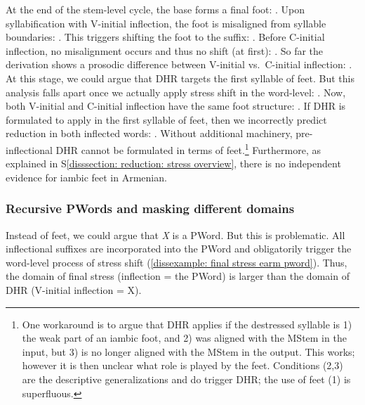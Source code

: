 At the end of the stem-level cycle, the base forms a final foot: \textit{}. Upon syllabification with V-initial inflection, the   foot is misaligned from syllable boundaries: \textit{}. This triggers shifting the foot to the suffix: \textit{}. Before C-initial inflection, no misalignment occurs and thus no shift (at first): \textit{}. 
So far the derivation shows a prosodic difference between V-initial vs.\ C-initial inflection: \textit{}. At this stage, we could argue that DHR targets the first syllable of feet. But this analysis falls apart once we actually apply stress shift in the word-level:    \textit{}. Now, both V-initial and C-initial inflection have the same foot structure:   \textit{}.  If DHR is formulated to apply in the first syllable of feet, then we incorrectly predict reduction in both inflected words: \textit{}. Without additional machinery, pre-inflectional DHR cannot be formulated in terms of feet.\footnote{One workaround is to argue that DHR applies if the destressed syllable is 1) the weak part of an iambic foot, and 2) was aligned with the MStem in the input, but 3) is no longer aligned with the MStem in the output. This works; however it is then unclear what role is played by the feet. Conditions (2,3) are the descriptive generalizations and do trigger DHR; the use of feet (1) is superfluous.} Furthermore, as explained in S\ref{disssection: reduction: stress overview}, there is no independent evidence for iambic feet in Armenian.%




\subsubsection{Recursive PWords and masking different domains}\label{disssection: reduction: destressed reduction EA: pword and feet: pword}

Instead of feet, we could argue that \textit{X} is a PWord. But this is problematic. All inflectional suffixes are incorporated into the PWord and   obligatorily trigger  the word-level process of  stress shift (\ref{dissexample: final stress earm pword}). Thus, the domain of final stress (inflection = the PWord) is larger than  the   domain  of DHR (V-initial inflection = X). 




